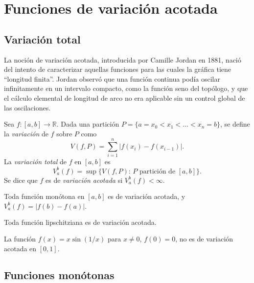 \chapter{Funciones de variación acotada}
\label{ch:variacion-acotada}

\section{Variación total}

La noción de variación acotada, introducida por Camille Jordan en 1881, nació del intento de caracterizar aquellas funciones para las cuales la gráfica tiene ``longitud finita''. Jordan observó que una función continua podía oscilar infinitamente en un intervalo compacto, como la función seno del topólogo, y que el cálculo elemental de longitud de arco no era aplicable sin un control global de las oscilaciones.

\begin{definition}
\label{def:variacion}
Sea $f\colon[a,b]\to\mathbb{R}$. Dada una partición $P=\{a=x_0<x_1<\dots<x_n=b\}$, se define la \emph{variación} de $f$ sobre $P$ como
\[
  V(f,P)=\sum_{i=1}^{n}|f(x_i)-f(x_{i-1})|.
\]
La \emph{variación total} de $f$ en $[a,b]$ es
\[
  V_a^b(f)=\sup\{V(f,P):\,P\text{ partición de }[a,b]\}.
\]
Se dice que $f$ es de \emph{variación acotada} si $V_a^b(f)<\infty$.
\end{definition}

\begin{example}
\label{ej:monotona-va}
Toda función monótona en $[a,b]$ es de variación acotada, y $V_a^b(f)=|f(b)-f(a)|$.
\end{example}

\begin{example}
\label{ej:lipschitz-va}
Toda función lipschitziana es de variación acotada.
\end{example}

\begin{example}
\label{ej:no-va}
La función $f(x)=x\sin(1/x)$ para $x\neq 0$, $f(0)=0$, no es de variación acotada en $[0,1]$.
\end{example}

\section{Funciones monótonas}

